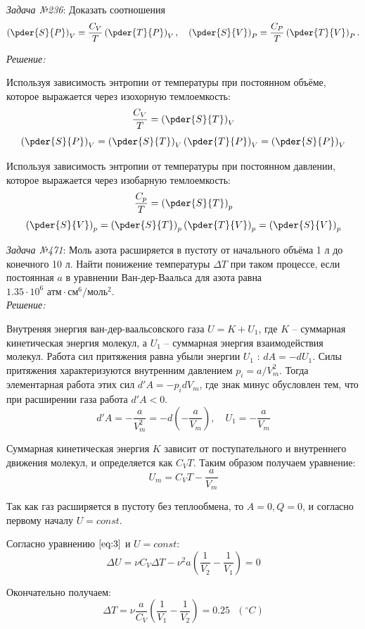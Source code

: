\documentclass[14pt,final,titlepage,pscyr]{hedsemwork}
\begin{document}
\newpage
\emph{Задача №236}: Доказать соотношения
\[
    \left( \pder{S}{P} \right)_V = 
        \frac{C_V}{T} \left( \pder{T}{P} \right)_V, \quad
    \left( \pder{S}{V} \right)_P = 
        \frac{C_P}{T} \left( \pder{T}{V} \right)_P.
\]

\emph{Решение:}

Используя зависимость энтропии от температуры при постоянном объёме, которое 
выражается через изохорную темлоемкость:
\[
	\frac{C_V}{T} = \left( \pder{S}{T} \right)_V
\]
\[
	\left( \pder{S}{P} \right)_V = \left( \pder{S}{T} \right)_V
		\left( \pder{T}{P} \right)_V = \left( \pder{S}{P} \right)_V
\]

Используя зависимость энтропии от температуры при постоянном давлении, которое 
выражается через изобарную темлоемкость:
\[
	\frac{C_p}{T} = \left( \pder{S}{T} \right)_p
\]
\[
	\left( \pder{S}{V} \right)_p = \left( \pder{S}{T} \right)_p
		\left( \pder{T}{V} \right)_p = \left( \pder{S}{V} \right)_p
\]

\newpage
\emph{Задача №471}: Моль азота расширяется в пустоту от начального объёма 
1 л до конечного 10 л. Найти понижение температуры \( \Delta T \) при 
таком процессе, если постоянная \( a \) в уравнении Ван-дер-Ваальса для 
азота равна \( 1.35\cdot10^6 \text{ атм}\cdot\text{см}^6/\text{моль}^2 \). \\

\emph{Решение:}

Внутреняя энергия ван-дер-ваальсовского газа \( U = K + U_1 \), где 
\( K \) -- суммарная кинетическая энергия молекул, а \( U_1 \) -- суммарная 
энергия взаимодействия молекул. Работа сил притяжения равна убыли энергии 
\( U_1 \) : \( dA = -dU_1 \). Силы притяжения характеризуются внутренним 
давлением \( p_i = a / V^2_m \). Тогда элементарная работа этих сил
\( d'A = -p_i dV_m \), где знак минус обусловлен тем, что при расширении газа 
работа \( d'A < 0 \).
\[
	d'A = -\frac{a}{V^2_m} = -d\left( -\frac{a}{V_m} \right), \quad
	U_1 = -\frac{a}{V_m}
\] 

Суммарная кинетическая энергия \( K \) зависит от поступательного и 
внутреннего движения молекул, и определяется как \( C_V T \). Таким образом 
получаем уравнение:
\begin{equation}
	U_m = C_V T - \frac{a}{V_m}
	\label{eq:3}
\end{equation} 

Так как газ расширяется в пустоту без теплообмена, то \( A = 0, Q = 0 \), и 
согласно первому началу \( U = const \).

Согласно уравнению \( \ref{eq:3} \) и \( U = const \):
\[
	\Delta U = \nu C_V \Delta T - \nu^2 a 
		\left( \frac{1}{V_2} - \frac{1}{V_1} \right) = 0
\]

Окончательно получаем:
\[
	\Delta T = \nu\frac{a}{C_V}\left( \frac{1}{V_1} - \frac{1}{V_2} \right) = 
		0.25 \text{ } (^\circ C)
\]
\end{document}
